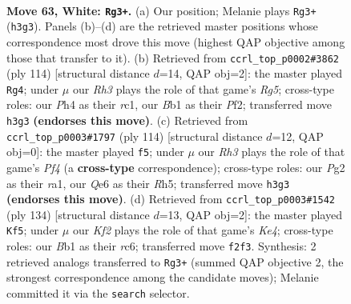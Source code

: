 \documentclass[11pt]{article}
\begin{document}
\clearpage

\begin{figure}[p]\centering
\begin{subfigure}{0.46\textwidth}\centering
\resizebox{\linewidth}{!}{%
\newchessgame
\chessboard[
  setfen={8/6k1/4Q3/8/7P/7R/5KP1/1B6 w - - 3 63},
  showmover=false,
  pgfstyle=straightmove, color=movearrow, markmove={h3-g3}
]}
\caption{}
\end{subfigure}\hfill
\begin{subfigure}{0.46\textwidth}\centering
\resizebox{\linewidth}{!}{%
\newchessgame
\chessboard[
  setfen={8/5k2/8/6R1/7P/7K/5P2/2r5 w - - 13 58},
  showmover=false,
  pgfstyle=straightmove, color=movearrow, markmove={g5-g4}
]}
\caption{}
\end{subfigure}
\\[4pt]
\begin{subfigure}{0.46\textwidth}\centering
\resizebox{\linewidth}{!}{%
\newchessgame
\chessboard[
  setfen={6k1/8/7P/7R/5PK1/8/8/r7 w - - 9 58},
  showmover=false,
  pgfstyle=straightmove, color=movearrow, markmove={f4-f5}
]}
\caption{}
\end{subfigure}\hfill
\begin{subfigure}{0.46\textwidth}\centering
\resizebox{\linewidth}{!}{%
\newchessgame
\chessboard[
  setfen={8/5k2/2r5/6RP/4KP2/8/8/8 w - - 3 68},
  showmover=false,
  pgfstyle=straightmove, color=movearrow, markmove={e4-f5}
]}
\caption{}
\end{subfigure}
\caption{\textbf{Move 63, White: \texttt{Rg3+}.} (a) Our position; Melanie plays \texttt{Rg3+} (\texttt{h3g3}). Panels (b)--(d) are the retrieved master positions whose correspondence most drove this move (highest QAP objective among those that transfer to it). (b) Retrieved from \texttt{ccrl\_top\_p0002\#3862} (ply 114) [structural distance $d$=14, QAP obj=2]: the master played \texttt{Rg4}; under $\mu$ our \emph{Rh3} plays the role of that game's \emph{Rg5}; cross-type roles: our \emph{P}h4 as their \emph{r}c1, our \emph{B}b1 as their \emph{P}f2; transferred move \texttt{h3g3} \textbf{(endorses this move)}. (c) Retrieved from \texttt{ccrl\_top\_p0003\#1797} (ply 114) [structural distance $d$=12, QAP obj=0]: the master played \texttt{f5}; under $\mu$ our \emph{Rh3} plays the role of that game's \emph{Pf4} (a \textbf{cross-type} correspondence); cross-type roles: our \emph{P}g2 as their \emph{r}a1, our \emph{Q}e6 as their \emph{R}h5; transferred move \texttt{h3g3} \textbf{(endorses this move)}. (d) Retrieved from \texttt{ccrl\_top\_p0003\#1542} (ply 134) [structural distance $d$=13, QAP obj=2]: the master played \texttt{Kf5}; under $\mu$ our \emph{Kf2} plays the role of that game's \emph{Ke4}; cross-type roles: our \emph{B}b1 as their \emph{r}c6; transferred move \texttt{f2f3}. Synthesis: 2 retrieved analogs transferred to \texttt{Rg3+} (summed QAP objective 2, the strongest correspondence among the candidate moves); Melanie committed it via the \texttt{search} selector.}
\label{fig:thought-m124}
\end{figure}
\end{document}
